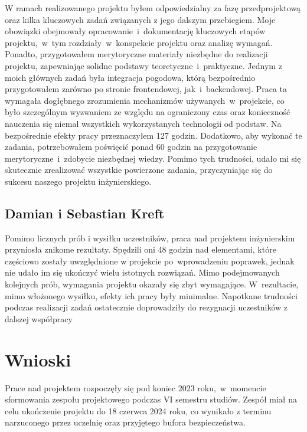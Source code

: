 W ramach realizowanego projektu byłem odpowiedzialny za fazę przedprojektową oraz kilka kluczowych zadań związanych z jego dalszym przebiegiem.\newline
Moje obowiązki obejmowały opracowanie~i~dokumentację kluczowych etapów projektu,~w~tym rozdziały~w~konspekcie projektu oraz analizę wymagań. \newline
Ponadto, przygotowałem merytoryczne materiały niezbędne do realizacji projektu, zapewniając solidne podstawy teoretyczne~i~praktyczne. \newline
Jednym z moich głównych zadań była integracja pogodowa, którą bezpośrednio przygotowałem zarówno po stronie frontendowej, jak~i~backendowej.\newline
\indent Praca ta wymagała dogłębnego zrozumienia mechanizmów używanych~w~projekcie, co było szczególnym wyzwaniem ze względu na ograniczony czas oraz konieczność nauczenia się niemal wszystkich wykorzystanych technologii od podstaw.
Na bezpośrednie efekty pracy przeznaczyłem 127 godzin. Dodatkowo, aby wykonać te zadania, potrzebowałem poświęcić ponad 60 godzin na przygotowanie merytoryczne~i~zdobycie niezbędnej wiedzy.\newline
Pomimo tych trudności, udało mi się skutecznie zrealizować wszystkie powierzone zadania, przyczyniając się do sukcesu naszego projektu inżynierskiego.

\subsection{Damian i Sebastian Kreft}
\label{subsec:bracia-kreft}
Pomimo licznych prób i wysiłku uczestników, praca nad projektem inżynierskim przyniosła znikome rezultaty. 
Spędzili oni 48 godzin nad elementami, które częściowo zostały uwzględnione w projekcie po~wprowadzeniu poprawek, jednak nie udało 
im się ukończyć wielu istotnych rozwiązań. Mimo podejmowanych kolejnych prób, wymagania projektu okazały się zbyt wymagające. 
W~rezultacie, mimo włożonego wysiłku, efekty ich pracy były minimalne. 
Napotkane trudności podczas realizacji zadań ostatecznie doprowadziły do rezygnacji uczestników z dalszej współpracy


\section{Wnioski}\label{sec:wnioski}
Prace nad projektem rozpoczęły się pod koniec 2023 roku,~w~momencie sformowania zespołu projektowego podczas VI semestru studiów.
Zespół miał na celu ukończenie projektu do 18 czerwca 2024 roku, co wynikało z terminu narzuconego przez uczelnię oraz przyjętego bufora bezpieczeństwa.

